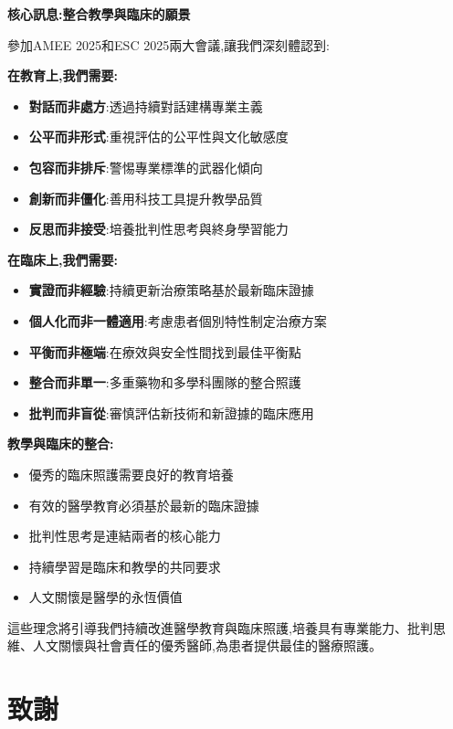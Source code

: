 \documentclass[12pt,a4paper]{article}
\begin{document}
\begin{importantbox}
\textbf{核心訊息:整合教學與臨床的願景}

參加AMEE 2025和ESC 2025兩大會議,讓我們深刻體認到:

\textbf{在教育上,我們需要:}
\begin{itemize}[nosep]
    \item \textbf{對話而非處方}:透過持續對話建構專業主義
    \item \textbf{公平而非形式}:重視評估的公平性與文化敏感度
    \item \textbf{包容而非排斥}:警惕專業標準的武器化傾向
    \item \textbf{創新而非僵化}:善用科技工具提升教學品質
    \item \textbf{反思而非接受}:培養批判性思考與終身學習能力
\end{itemize}

\textbf{在臨床上,我們需要:}
\begin{itemize}[nosep]
    \item \textbf{實證而非經驗}:持續更新治療策略基於最新臨床證據
    \item \textbf{個人化而非一體適用}:考慮患者個別特性制定治療方案
    \item \textbf{平衡而非極端}:在療效與安全性間找到最佳平衡點
    \item \textbf{整合而非單一}:多重藥物和多學科團隊的整合照護
    \item \textbf{批判而非盲從}:審慎評估新技術和新證據的臨床應用
\end{itemize}

\textbf{教學與臨床的整合:}
\begin{itemize}[nosep]
    \item 優秀的臨床照護需要良好的教育培養
    \item 有效的醫學教育必須基於最新的臨床證據
    \item 批判性思考是連結兩者的核心能力
    \item 持續學習是臨床和教學的共同要求
    \item 人文關懷是醫學的永恆價值
\end{itemize}

這些理念將引導我們持續改進醫學教育與臨床照護,培養具有專業能力、批判思維、人文關懷與社會責任的優秀醫師,為患者提供最佳的醫療照護。
\end{importantbox}

\section*{致謝}
\end{document}
